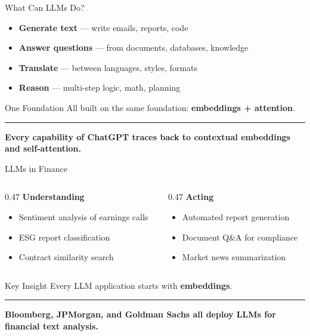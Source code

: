 \documentclass[8pt,aspectratio=169]{beamer}
\newcommand{\bottomnote}[1]{%
\vfill
\vspace{-2mm}
\textcolor{mllavender2}{\rule{\textwidth}{0.4pt}}
\vspace{1mm}
\footnotesize
\textbf{#1}
}
\newenvironment{compactlist}{%
  \begin{itemize}%
    \setlength{\itemsep}{2pt}%
    \setlength{\parskip}{0pt}%
    \setlength{\parsep}{0pt}%
}{%
  \end{itemize}%
}
\begin{document}
\begin{frame}{What Can LLMs Do?}
\vspace{2mm}
\begin{compactlist}
  \item \textcolor{mlpurple}{\textbf{Generate text}} --- write emails, reports, code
  \item \textcolor{mlblue}{\textbf{Answer questions}} --- from documents, databases, knowledge
  \item \textcolor{mlorange}{\textbf{Translate}} --- between languages, styles, formats
  \item \textcolor{mlgreen}{\textbf{Reason}} --- multi-step logic, math, planning
\end{compactlist}

\vspace{4mm}
\begin{block}{One Foundation}
All built on the same foundation: \textbf{embeddings + attention}.
\end{block}
\bottomnote{Every capability of ChatGPT traces back to contextual embeddings and self-attention.}
\end{frame}

\begin{frame}{LLMs in Finance}
\begin{columns}[t]
\begin{column}{0.47\textwidth}
\textcolor{mlpurple}{\textbf{Understanding}}
\begin{compactlist}
  \item Sentiment analysis of earnings calls
  \item ESG report classification
  \item Contract similarity search
\end{compactlist}
\end{column}
\begin{column}{0.47\textwidth}
\textcolor{mlblue}{\textbf{Acting}}
\begin{compactlist}
  \item Automated report generation
  \item Document Q\&A for compliance
  \item Market news summarization
\end{compactlist}
\end{column}
\end{columns}

\vspace{4mm}
\begin{block}{Key Insight}
Every LLM application starts with \textbf{embeddings}.
\end{block}
\bottomnote{Bloomberg, JPMorgan, and Goldman Sachs all deploy LLMs for financial text analysis.}
\end{frame}
\end{document}
